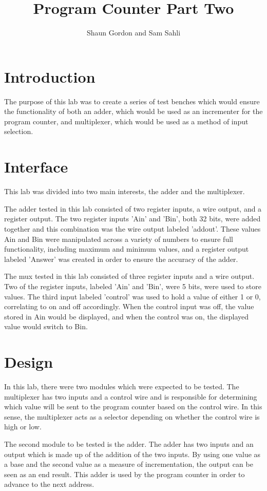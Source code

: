 \documentclass{article}
\author{Shaun Gordon and Sam Sahli}
\title{Program Counter Part Two}
\begin{document}
\maketitle

\section{Introduction}
The purpose of this lab was to create a series of test benches which would ensure the functionality of both an adder, which would be used as an incrementer for the program counter, and multiplexer, which would be used as a method of input selection.

\section{Interface}
This lab was divided into two main interests, the adder and the multiplexer.

The adder tested in this lab consisted of two register inputs, a wire output, and a register output. The two register inputs 'Ain' and 'Bin', both 32 bits, were added together and this combination was the wire output labeled 'addout'. These values Ain and Bin were manipulated across a variety of numbers to ensure full functionality, including maximum and minimum values, and a register output labeled 'Answer' was created in order to ensure the accuracy of the adder.

The mux tested in this lab consisted of three register inputs and a wire output. Two of the register inputs, labeled 'Ain' and 'Bin', were 5 bits, were used to store values. The third input labeled 'control' was used to hold a value of either 1 or 0, correlating to on and off accordingly. When the control input was off, the value stored in Ain would be displayed, and when the control was on, the displayed value would switch to Bin.  

\section{Design}
In this lab, there were two modules which were expected to be tested. The multiplexer has two inputs and a control wire and is responsible for determining which value will be sent to the program counter based on the control wire. In this sense, the multiplexer acts as a selector depending on whether the control wire is high or low.

The second module to be tested is the adder. The adder has two inputs and an output which is made up of the addition of the two inputs. By using one value as a base and the second value as a measure of incrementation, the output can be seen as an end result. This adder is used by the program counter in order to advance to the next address.
\end{document}
